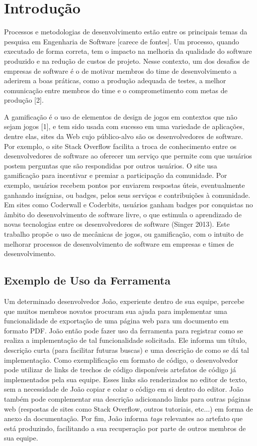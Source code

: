 \chapter{Introdução}

Processos e metodologias de desenvolvimento estão entre os principais temas da pesquisa em Engenharia de Software [carece de fontes]. Um processo, quando executado de forma correta, tem o impacto na melhoria da qualidade do software produzido e na redução de custos de projeto. Nesse contexto, um dos desafios de empresas de software é o de motivar membros do time de desenvolvimento a aderirem a boas práticas, como a produção adequada de testes, a melhor comunicação entre membros do time e o comprometimento com metas de produção [2].

A gamificação é o uso de elementos de design de jogos em contextos que não sejam jogos [1], e tem sido usada com sucesso em uma variedade de aplicações, dentre elas, sites da Web cujo público-alvo são os desenvolvedores de software. Por exemplo, o site Stack Overflow facilita a troca de conhecimento entre os desenvolvedores de software ao oferecer um serviço que permite com que usuários postem perguntas que são respondidas por outros usuários. O site usa gamificação para incentivar e premiar a participação da comunidade. Por exemplo, usuários recebem pontos por enviarem respostas úteis, eventualmente ganhando insígnias, ou badges, pelos seus serviços e contribuições à comunidade. Em sites como Coderwall e Coderbits, usuários ganham badges por conquistas no âmbito do desenvolvimento de software livre, o que estimula o aprendizado de novas tecnologias entre os desenvolvedores de software (Singer 2013). Este trabalho propõe o uso de mecânicas de jogos, ou gamificação, com o intuito de melhorar processos de desenvolvimento de software em empresas e times de desenvolvimento. 

\section{Exemplo de Uso da Ferramenta}

Um determinado desenvolvedor João, experiente dentro de sua equipe, percebe que muitos membros novatos procuram sua ajuda para implementar uma funcionalidade de exportação de uma página web para um documento em formato PDF. João então pode fazer uso da ferramenta para registrar como se realiza a implementação de tal funcionalidade solicitada. Ele informa um título, descrição curta (para facilitar futuras buscas) e uma descrição de como se dá tal implementação. Como exemplificação em formato de código, o desenvolvedor pode utilizar de links de trechos de código disponíveis artefatos de código já implementados pela sua equipe. Esses links são renderizados no editor de texto, sem a necessidade de João copiar e colar o código em si dentro do editor. João também pode complementar sua descrição adicionando links para outras páginas web (respostas de sites como Stack Overflow, outros tutoriais, etc...) em forma de anexo da documentação. Por fim, João informa \textit{tags} relevantes ao artefato que está produzindo, facilitando a sua recuperação por parte de outros membros de sua equipe.

